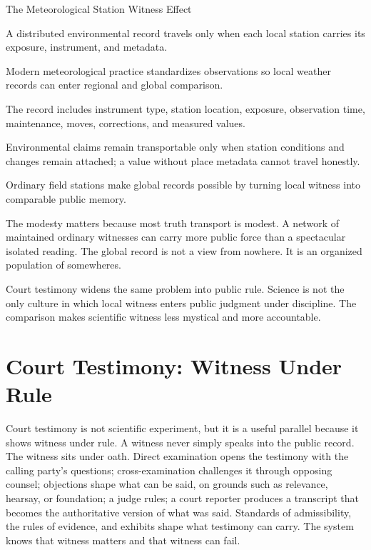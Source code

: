 \begin{phenom}{The Meteorological Station Witness Effect~\cite{wmo2018}}
\label{ph:meteorological-station-witness}

\PhStatement
A distributed environmental record travels only when each local station carries
its exposure, instrument, and metadata.

\PhOrigin
Modern meteorological practice standardizes observations so local weather
records can enter regional and global comparison.

\PhObservation
The record includes instrument type, station location, exposure, observation
time, maintenance, moves, corrections, and measured values.

\PhConstraint
Environmental claims remain transportable only when station conditions
and changes remain attached; a value without place metadata cannot
travel honestly.

\PhConsequence
Ordinary field stations make global records possible by turning local witness
into comparable public memory.
\end{phenom}

The modesty matters because most truth transport is modest. A network of
maintained ordinary witnesses can carry more public force than a
spectacular isolated reading. The global record is not a view from
nowhere. It is an organized population of somewheres.

Court testimony widens the same problem into public rule. Science is not
the only culture in which local witness enters public judgment under
discipline. The comparison makes scientific witness less mystical and
more accountable.

\section{Court Testimony: Witness Under Rule}

Court testimony is not scientific experiment, but it is a useful
parallel because it shows witness under rule. A witness never simply
speaks into the public record. The witness sits under oath. Direct
examination opens the testimony with the calling party's questions;
cross-examination challenges it through opposing counsel; objections
shape what can be said, on grounds such as relevance, hearsay, or
foundation; a judge rules; a court reporter produces a transcript that
becomes the authoritative version of what was said. Standards of
admissibility, the rules of evidence, and exhibits shape what testimony
can carry. The system knows that witness matters and that witness can
fail.


